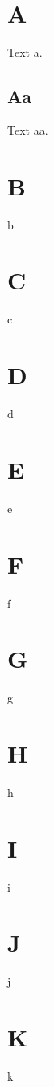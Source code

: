 \documentclass{article}
\begin{document}
\tableofcontents
\section{A}\label{sec:a} Text a.
\subsection{Aa}\label{sub:aa} Text aa.
\section{B}b\section{C}c\section{D}d\section{E}e\section{F}f
\section{G}g\section{H}h\section{I}i\section{J}j\section{K}k
\end{document}
